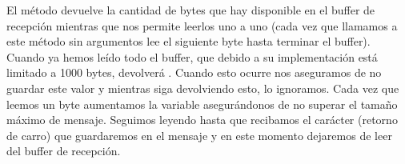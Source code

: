 
El método  devuelve la cantidad de bytes que hay disponible en el buffer de recepción mientras que  nos permite leerlos uno a uno (cada vez que llamamos a este método sin argumentos lee el siguiente byte hasta terminar el buffer). Cuando ya hemos leído todo el buffer, que debido a su implementación está limitado a 1000 bytes,  devolverá . Cuando esto ocurre nos aseguramos de no guardar este valor y mientras siga devolviendo esto, lo ignoramos. Cada vez que leemos un byte aumentamos la variable  asegurándonos de no superar el tamaño máximo de mensaje. Seguimos leyendo hasta que recibamos el carácter  (retorno de carro) que guardaremos en el mensaje y en este momento dejaremos de leer del buffer de recepción.

